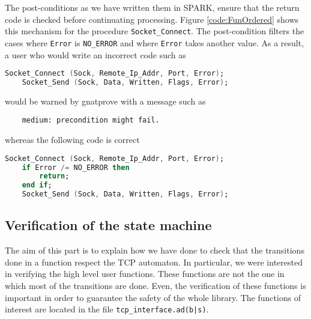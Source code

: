 \documentclass[a4paper, 10pt]{article}
\begin{document}
    The post-conditions as we have written them in SPARK, ensure that the return code is checked
    before continuating processing. Figure \ref{code:FunOrdered} shows this mechanism for the
    procedure \lstinline[language=Ada]{Socket_Connect}. The post-condition filters the cases
    where \lstinline{Error} is \lstinline{NO_ERROR} and where \lstinline{Error} takes another value.
    As a result, a user who would write an incorrect code such as
    \begin{lstlisting}[language=Ada]
    Socket_Connect (Sock, Remote_Ip_Addr, Port, Error);
    Socket_Send (Sock, Data, Written, Flags, Error);
    \end{lstlisting}
    would be warned by gnatprove with a message such as
    \begin{verbatim}
    medium: precondition might fail.
    \end{verbatim}
    whereas the following code is correct
    \begin{lstlisting}[language=Ada]
    Socket_Connect (Sock, Remote_Ip_Addr, Port, Error);
    if Error /= NO_ERROR then
        return;
    end if;
    Socket_Send (Sock, Data, Written, Flags, Error);
    \end{lstlisting}





    \subsection{Verification of the state machine}

    The aim of this part is to explain how we have done to check that the transitions done
    in a function respect the TCP automaton. In particular, we were interested in verifying
    the high level user functions. These functions are not the one in which most of the
    transitions are done. Even, the verification of these functions is important in order
    to guarantee the safety of the whole library. The functions of interest are located in
    the file \texttt{tcp\_interface.ad(b|s)}.
\end{document}
